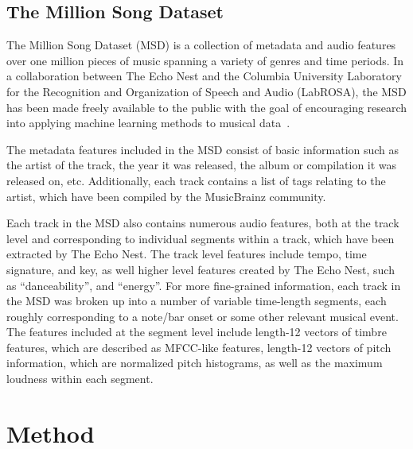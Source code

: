\documentclass{article} %
\begin{document}
\subsection{The Million Song Dataset}
The Million Song Dataset (MSD) is a collection of metadata and audio features over one million pieces of music spanning a variety of genres and time periods. In a collaboration between The Echo Nest and the Columbia University Laboratory for the Recognition and Organization of Speech and Audio (LabROSA), the MSD has been made freely available to the public with the goal of encouraging research into applying machine learning methods to musical data~\cite{msd}.
\par The metadata features included in the MSD consist of basic information such as the artist of the track, the year it was released, the album or compilation it was released on, etc. Additionally, each track contains a list of tags relating to the artist, which have been compiled by the MusicBrainz community.
\par Each track in the MSD also contains numerous audio features, both at the track level and corresponding to individual segments within a track, which have been extracted by The Echo Nest. The track level features include tempo, time signature, and key, as well higher level features created by The Echo Nest, such as ``danceability'', and ``energy''. For more fine-grained information, each track in the MSD was broken up into a number of variable time-length segments, each roughly corresponding to a note/bar onset or some other relevant musical event. The features included at the segment level include length-12 vectors of timbre features, which are described as MFCC-like features, length-12 vectors of pitch information, which are normalized pitch histograms, as well as the maximum loudness within each segment.



\section{Method}
\end{document}
